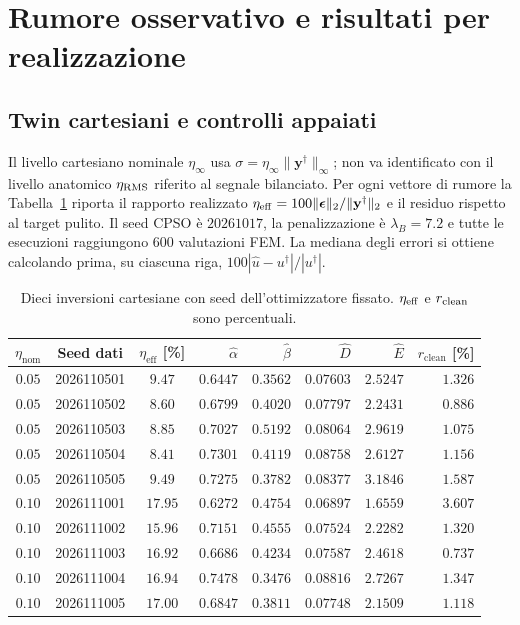 \section{Rumore osservativo e risultati per realizzazione}
\label{app:noise}
\setcounter{figure}{0}\setcounter{table}{0}\setcounter{equation}{0}

\subsection{Twin cartesiani e controlli appaiati}
Il livello cartesiano nominale $\eta_{\infty}$ usa $\sigma=\eta_{\infty}\|\mathbf y^\dagger\|_\infty$; non va identificato con il livello anatomico $\eta_{\rm RMS}$ riferito al segnale bilanciato. Per ogni vettore di rumore la Tabella~\ref{tab:app-noisy-runs} riporta il rapporto realizzato $\eta_{\rm eff}=100\|\boldsymbol\epsilon\|_2/\|\mathbf y^\dagger\|_2$ e il residuo rispetto al target pulito. Il seed CPSO è $20261017$, la penalizzazione è $\lambda_B=7.2$ e tutte le esecuzioni raggiungono 600 valutazioni FEM. La mediana degli errori si ottiene calcolando prima, su ciascuna riga, $100|\widehat u-u^\dagger|/|u^\dagger|$.

\begin{table}[H]
\centering
\caption{Dieci inversioni cartesiane con seed dell'ottimizzatore fissato. $\eta_{\rm eff}$ e $r_{\rm clean}$ sono percentuali.}
\label{tab:app-noisy-runs}
\small
\setlength{\tabcolsep}{7pt}
\begin{tabular}{@{}cccrrrrr@{}}
\toprule
$\eta_{\mathrm{nom}}$ & Seed dati & $\eta_{\mathrm{eff}}$ [\%] & $\hat{\alpha}$ & $\hat{\beta}$ & $\hat{D}$ & $\hat{E}$ & $r_{\mathrm{clean}}$ [\%] \\
\midrule
$0.05$ & 2026110501 & $9.47$  & $0.6447$ & $0.3562$ & $0.07603$ & $2.5247$ & $1.326$ \\
$0.05$ & 2026110502 & $8.60$  & $0.6799$ & $0.4020$ & $0.07797$ & $2.2431$ & $0.886$ \\
$0.05$ & 2026110503 & $8.85$  & $0.7027$ & $0.5192$ & $0.08064$ & $2.9619$ & $1.075$ \\
$0.05$ & 2026110504 & $8.41$  & $0.7301$ & $0.4119$ & $0.08758$ & $2.6127$ & $1.156$ \\
$0.05$ & 2026110505 & $9.49$  & $0.7275$ & $0.3782$ & $0.08377$ & $3.1846$ & $1.587$ \\
\midrule
$0.10$ & 2026111001 & $17.95$ & $0.6272$ & $0.4754$ & $0.06897$ & $1.6559$ & $3.607$ \\
$0.10$ & 2026111002 & $15.96$ & $0.7151$ & $0.4555$ & $0.07524$ & $2.2282$ & $1.320$ \\
$0.10$ & 2026111003 & $16.92$ & $0.6686$ & $0.4234$ & $0.07587$ & $2.4618$ & $0.737$ \\
$0.10$ & 2026111004 & $16.94$ & $0.7478$ & $0.3476$ & $0.08816$ & $2.7267$ & $1.347$ \\
$0.10$ & 2026111005 & $17.00$ & $0.6847$ & $0.3811$ & $0.07748$ & $2.1509$ & $1.118$ \\
\bottomrule
\end{tabular}
\end{table}

